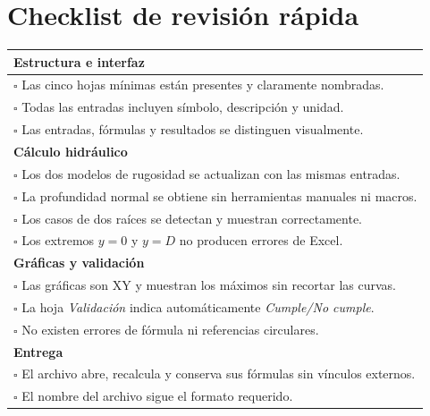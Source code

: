 \documentclass[12pt]{article}
\begin{document}
\clearpage
\section{Checklist de revisión rápida}
\begin{longtable}{p{}}
\toprule
\textbf{Estructura e interfaz} \\
\midrule
$\square$ Las cinco hojas mínimas están presentes y claramente nombradas. \\
$\square$ Todas las entradas incluyen símbolo, descripción y unidad. \\
$\square$ Las entradas, fórmulas y resultados se distinguen visualmente. \\
\midrule
\textbf{Cálculo hidráulico} \\
\midrule
$\square$ Los dos modelos de rugosidad se actualizan con las mismas entradas. \\
$\square$ La profundidad normal se obtiene sin herramientas manuales ni macros. \\
$\square$ Los casos de dos raíces se detectan y muestran correctamente. \\
$\square$ Los extremos $y=0$ y $y=D$ no producen errores de Excel. \\
\midrule
\textbf{Gráficas y validación} \\
\midrule
$\square$ Las gráficas son XY y muestran los máximos sin recortar las curvas. \\
$\square$ La hoja \emph{Validación} indica automáticamente \emph{Cumple/No cumple}. \\
$\square$ No existen errores de fórmula ni referencias circulares. \\
\midrule
\textbf{Entrega} \\
\midrule
$\square$ El archivo abre, recalcula y conserva sus fórmulas sin vínculos externos. \\
$\square$ El nombre del archivo sigue el formato requerido. \\
\bottomrule
\end{longtable}
\end{document}
